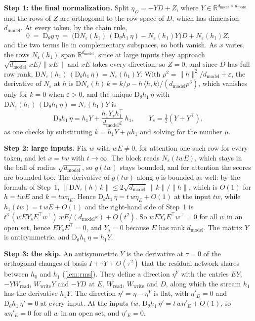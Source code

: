 \documentclass[10pt]{article}
\theoremstyle{definition}
\theoremstyle{remark}
\newcommand{\R}{\mathbb{R}}
\newcommand{\Wread}{W_{\mathrm{read}}}
\newcommand{\Wwrite}{W_{\mathrm{write}}}
\newcommand{\dm}{d_{\mathrm{model}}}
\newcommand{\Der}{\mathrm{D}}
\newcommand{\norm}[1]{\lVert #1\rVert}
\newcommand{\para}[1]{\smallskip\noindent\textbf{#1}\hspace{0.5em}}
\begin{document}
\para{Step 1: the final normalization.} Split $\eta_D = -YD + Z$, where $Y \in \R^{\dm\times\dm}$ and the rows of $Z$ are orthogonal to the row space of $D$, which has dimension $\dm$. At every token, by the chain rule,
\[
0 \;=\; \Der_\theta y\,\eta \;=\; \big(\Der N_\varepsilon(h_1)\,(\Der_\theta h_1\,\eta) - N_\varepsilon(h_1)Y\big)D + N_\varepsilon(h_1)Z,
\]
and the two terms lie in complementary subspaces, so both vanish. As $x$ varies, the rows $N_\varepsilon(h_1)$ span $\R^{\dm}$, since at large inputs they approach $\sqrt{\dm}\,xE/\norm{xE}$ and $xE$ takes every direction, so $Z = 0$; and since $D$ has full row rank, $\Der N_\varepsilon(h_1)\,(\Der_\theta h_1\,\eta) = N_\varepsilon(h_1)Y$. With $\rho^2 = \norm{h}^2/\dm + \varepsilon$, the derivative of $N_\varepsilon$ at $h$ is $\Der N_\varepsilon(h)\,k = k/\rho - h\,\langle h, k\rangle/(\dm\rho^3)$, which vanishes only for $k = 0$ when $\varepsilon > 0$, and the unique $\Der_\theta h_1\,\eta$ with $\Der N_\varepsilon(h_1)\,(\Der_\theta h_1\,\eta) = N_\varepsilon(h_1)Y$ is
\[
\Der_\theta h_1\,\eta = h_1Y + \frac{h_1Y_sh_1^\top}{\dm\varepsilon}\,h_1, \qquad Y_s = \tfrac12(Y + Y^\top),
\]
as one checks by substituting $k = h_1Y + \mu h_1$ and solving for the number $\mu$.

\para{Step 2: large inputs.} Fix $w$ with $wE \neq 0$, for attention one such row for every token, and let $x = tw$ with $t \to \infty$. The block reads $N_\varepsilon(twE)$, which stays in the ball of radius $\sqrt{\dm}$, so $g(tw)$ stays bounded, and for attention the scores are bounded too. The derivative of $g(tw)$ along $\eta$ is bounded as well: by the formula of Step~1, $\norm{\Der N_\varepsilon(h)\,k} \le 2\sqrt{\dm}\,\norm{k}/\norm{h}$, which is $O(1)$ for $h = twE$ and $k = tw\eta_E$. Hence $\Der_\theta h_1\,\eta = t\,w\eta_E + O(1)$ at the input $tw$, while $h_1(tw) = t\,wE + O(1)$ and the right-hand side of Step~1 is $t^3\,(wEY_sE^\top w^\top)\,wE/(\dm\varepsilon) + O(t^2)$. So $wEY_sE^\top w^\top = 0$ for all $w$ in an open set, hence $EY_sE^\top = 0$, and $Y_s = 0$ because $E$ has rank $\dm$. The matrix $Y$ is antisymmetric, and $\Der_\theta h_1\,\eta = h_1Y$.

\para{Step 3: the skip.} An antisymmetric $Y$ is the derivative at $\tau = 0$ of the orthogonal changes of basis $I + \tau Y + O(\tau^2)$ that the residual network shares between $h_0$ and $h_1$ (\cref{lem:rms}). They define a direction $\eta^Y$ with the entries $EY$, $-Y\Wread$, $\Wwrite Y$ and $-YD$ at $E$, $\Wread$, $\Wwrite$ and $D$, along which the stream $h_1$ has the derivative $h_1Y$. The direction $\eta' = \eta - \eta^Y$ is flat, with $\eta'_D = 0$ and $\Der_\theta h_1\,\eta' = 0$ at every input. At the inputs $tw$, $\Der_\theta h_1\,\eta' = t\,w\eta'_E + O(1)$, so $w\eta'_E = 0$ for all $w$ in an open set, and $\eta'_E = 0$.
\end{document}
